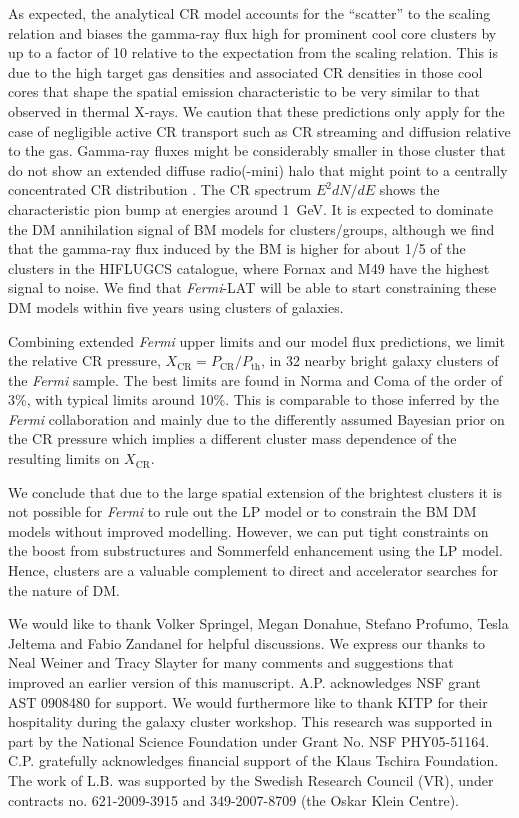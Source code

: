 \documentclass[10pt,aps,pra,reprint,amsmath,amsfonts,amssymb,showpacs,nofootinbib,floatfix]{revtex4-1}
\newcommand{\Fermi}{{\em Fermi}\xspace}
\newcommand{\rmn}{\mathrm}
\newcommand{\CR}{\rmn{CR}}
\begin{document}
As expected, the analytical CR model accounts for the ``scatter'' to
the scaling relation and biases the gamma-ray flux high for prominent
cool core clusters by up to a factor of 10 relative to the expectation
from the scaling relation. This is due to the high target gas
densities and associated CR densities in those cool cores that shape
the spatial emission characteristic to be very similar to that
observed in thermal X-rays. We caution that these predictions only
apply for the case of negligible active CR transport such as CR
streaming and diffusion relative to the gas. Gamma-ray fluxes might be
considerably smaller in those cluster that do not show an extended
diffuse radio(-mini) halo that might point to a centrally concentrated
CR distribution \cite{2011A&A...527A..99E}. The CR spectrum $E^2
dN/dE$ shows the characteristic pion bump at energies around 1~GeV. It
is expected to dominate the DM annihilation signal of BM models for
clusters/groups, although we find that the gamma-ray flux induced by
the BM is higher for about 1/5 of the clusters in the HIFLUGCS
catalogue, where Fornax and M49 have the highest signal to noise. We
find that \Fermi-LAT will be able to start constraining these DM
models within five years using clusters of galaxies.

Combining extended \Fermi upper limits and our model flux predictions,
we limit the relative CR pressure, $X_\CR = P_\CR/P_\rmn{th}$, in 32
nearby bright galaxy clusters of the \Fermi sample. The best limits
are found in Norma and Coma of the order of 3\%, with typical limits
around 10\%. This is comparable to those inferred by the \Fermi
collaboration \cite{2010ApJ...717L..71A} and mainly due to the
differently assumed Bayesian prior on the CR pressure which implies a
different cluster mass dependence of the resulting limits on $X_\CR$.

We conclude that due to the large spatial extension of the brightest
clusters it is not possible for \Fermi to rule out the LP model or to
constrain the BM DM models without improved modelling. However, we can
put tight constraints on the boost from substructures and Sommerfeld
enhancement using the LP model. Hence, clusters are a valuable
complement to direct and accelerator searches for the nature of DM.



\smallskip We would like to thank Volker Springel, Megan Donahue,
Stefano Profumo, Tesla Jeltema and Fabio Zandanel for helpful
discussions. We express our thanks to Neal Weiner and Tracy Slayter
for many comments and suggestions that improved an earlier version of
this manuscript. A.P. acknowledges NSF grant AST 0908480 for
support. We would furthermore like to thank KITP for their hospitality
during the galaxy cluster workshop. This research was supported in
part by the National Science Foundation under Grant No. NSF
PHY05-51164. C.P. gratefully acknowledges financial support of the
Klaus Tschira Foundation. The work of L.B. was supported by the
Swedish Research Council (VR), under contracts no. 621-2009-3915 and
349-2007-8709 (the Oskar Klein Centre).
\end{document}
